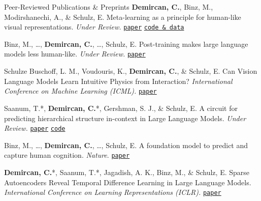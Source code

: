 
\begin{rubric}{Peer-Reviewed Publications \& Preprints}
    \entry*[2026]
    \textbf{Demircan, C.}, Binz, M., Modirshanechi, A., \& Schulz, E. Meta-learning as a principle for human-like visual representations. \emph{Under Review.} {\href{https://arxiv.org/abs/2606.28399}{\textcolor{MarkerColour}{\lbrack\texttt{paper}\rbrack}}} {\href{https://github.com/candemircan/metalign}{\textcolor{MarkerColour}{\lbrack\texttt{code \& data}\rbrack}}} \par

    \entry*[2026]
    Binz, M., \ldots  , \textbf{Demircan, C.}, \ldots  , Schulz, E. Post-training makes large language models less human-like. \emph{Under Review.} {\href{https://arxiv.org/abs/2605.07632}{\textcolor{MarkerColour}{\lbrack\texttt{paper}\rbrack}}} \par

    \entry*[2026]
    Schulze Buschoff, L. M., Voudouris, K., \textbf{Demircan, C.}, \& Schulz, E. Can Vision Language Models Learn Intuitive Physics from Interaction? \emph{International Conference on Machine Learning (ICML).} {\href{https://arxiv.org/abs/2602.06033}{\textcolor{MarkerColour}{\lbrack\texttt{paper}\rbrack}}} \par

    \entry*[2025]
    Saanum, T.*, \textbf{Demircan, C.}*, Gershman, S. J., \& Schulz, E. A circuit for predicting hierarchical structure in-context in Large Language Models. \emph{Under Review.} {\href{https://www.arxiv.org/abs/2509.21534}{\textcolor{MarkerColour}{\lbrack\texttt{paper}\rbrack}}} {\href{https://github.com/tankred-saanum/smart_induction_heads}{\textcolor{MarkerColour}{\lbrack\texttt{code}\rbrack}}} \par

	\entry*[2025]
	Binz, M., \ldots  , \textbf{Demircan, C.}, \ldots  , Schulz, E. A foundation model to predict and capture human cognition. \emph{Nature}. {\href{https://www.nature.com/articles/s41586-025-09215-4}{\textcolor{MarkerColour}{\lbrack\texttt{paper}\rbrack}}} \par

    \entry*[2025]
    \textbf{Demircan, C.}*, Saanum, T.*, Jagadish, A. K., Binz, M., \& Schulz, E. Sparse Autoencoders Reveal Temporal Difference Learning in Large Language Models. \emph{International Conference on Learning Representations (ICLR).} {\href{https://openreview.net/forum?id=2tIyA5cri8}{\textcolor{MarkerColour}{\lbrack\texttt{paper}\rbrack}}} \par


\end{rubric}
